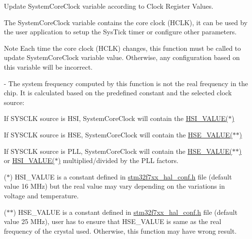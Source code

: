 Update System\+Core\+Clock variable according to Clock Register Values. 

The System\+Core\+Clock variable contains the core clock (H\+C\+LK), it can be used by the user application to setup the Sys\+Tick timer or configure other parameters.

\begin{DoxyNote}{Note}
Each time the core clock (H\+C\+LK) changes, this function must be called to update System\+Core\+Clock variable value. Otherwise, any configuration based on this variable will be incorrect.

-\/ The system frequency computed by this function is not the real frequency in the chip. It is calculated based on the predefined constant and the selected clock source\+:
\end{DoxyNote}

\begin{DoxyItemize}
\item If S\+Y\+S\+C\+LK source is H\+SI, System\+Core\+Clock will contain the \mbox{\hyperlink{group__STM32F7xx__System__Private__Includes_gaaa8c76e274d0f6dd2cefb5d0b17fbc37}{H\+S\+I\+\_\+\+V\+A\+L\+U\+E($\ast$)}}
\item If S\+Y\+S\+C\+LK source is H\+SE, System\+Core\+Clock will contain the \mbox{\hyperlink{group__STM32F7xx__System__Private__Includes_gaeafcff4f57440c60e64812dddd13e7cb}{H\+S\+E\+\_\+\+V\+A\+L\+U\+E($\ast$$\ast$)}}
\item If S\+Y\+S\+C\+LK source is P\+LL, System\+Core\+Clock will contain the \mbox{\hyperlink{group__STM32F7xx__System__Private__Includes_gaeafcff4f57440c60e64812dddd13e7cb}{H\+S\+E\+\_\+\+V\+A\+L\+U\+E($\ast$$\ast$)}} or \mbox{\hyperlink{group__STM32F7xx__System__Private__Includes_gaaa8c76e274d0f6dd2cefb5d0b17fbc37}{H\+S\+I\+\_\+\+V\+A\+L\+U\+E($\ast$)}} multiplied/divided by the P\+LL factors.
\end{DoxyItemize}

($\ast$) H\+S\+I\+\_\+\+V\+A\+L\+UE is a constant defined in \mbox{\hyperlink{stm32f7xx__hal__conf_8h_source}{stm32f7xx\+\_\+hal\+\_\+conf.\+h}} file (default value 16 M\+Hz) but the real value may vary depending on the variations in voltage and temperature.

($\ast$$\ast$) H\+S\+E\+\_\+\+V\+A\+L\+UE is a constant defined in \mbox{\hyperlink{stm32f7xx__hal__conf_8h_source}{stm32f7xx\+\_\+hal\+\_\+conf.\+h}} file (default value 25 M\+Hz), user has to ensure that H\+S\+E\+\_\+\+V\+A\+L\+UE is same as the real frequency of the crystal used. Otherwise, this function may have wrong result.


